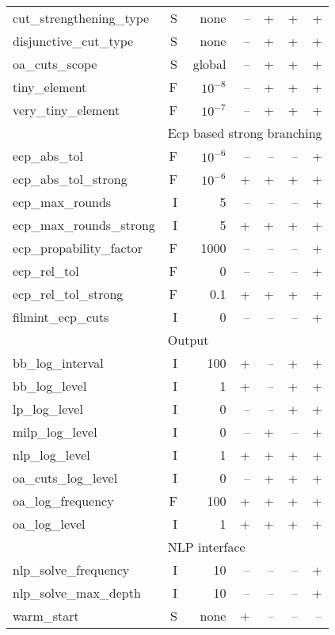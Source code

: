 \begin{center}
\begin{tabular}{|l|r|r|r|r|r|r|}
cut\_strengthening\_type& S& none& --& +& +& +\\
disjunctive\_cut\_type& S& none& --& +& +& +\\
oa\_cuts\_scope& S& global& --& +& +& +\\
tiny\_element& F& $10^{-8}$& --& +& +& +\\
very\_tiny\_element& F& $10^{-7}$& --& +& +& +\\
\hline
\multicolumn{1}{|c}{} & \multicolumn{6}{l|}{Ecp based strong branching}\\
\hline
ecp\_abs\_tol& F& $10^{-6}$& --& --& --& +\\
ecp\_abs\_tol\_strong& F& $10^{-6}$& +& +& +& +\\
ecp\_max\_rounds& I& 5& --& --& --& +\\
ecp\_max\_rounds\_strong& I& 5& +& +& +& +\\
ecp\_propability\_factor& F& 1000& --& --& --& +\\
ecp\_rel\_tol& F& 0& --& --& --& +\\
ecp\_rel\_tol\_strong& F& 0.1& +& +& +& +\\
filmint\_ecp\_cuts& I& 0& --& --& --& +\\
\hline
\multicolumn{1}{|c}{} & \multicolumn{6}{l|}{Output}\\
\hline
bb\_log\_interval& I& 100& +& --& +& +\\
bb\_log\_level& I& 1& +& --& +& +\\
lp\_log\_level& I& 0& --& --& +& +\\
milp\_log\_level& I& 0& --& +& --& +\\
nlp\_log\_level& I& 1& +& +& +& +\\
oa\_cuts\_log\_level& I& 0& --& +& +& +\\
oa\_log\_frequency& F& 100& +& +& +& +\\
oa\_log\_level& I& 1& +& +& +& +\\
\hline
\multicolumn{1}{|c}{} & \multicolumn{6}{l|}{NLP interface}\\
\hline
nlp\_solve\_frequency& I& 10& --& --& --& +\\
nlp\_solve\_max\_depth& I& 10& --& --& --& +\\
warm\_start& S& none& +& --& --& --\\
\hline
\end{tabular}


\end{center}
